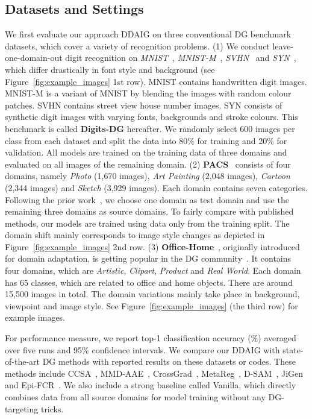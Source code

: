 \documentclass[letterpaper]{article}
\begin{document}
\subsection{Datasets and Settings}
We first evaluate our approach DDAIG on three conventional DG benchmark datasets, which cover a variety of recognition problems.
(1) We conduct leave-one-domain-out digit recognition on \emph{MNIST}~\cite{lecun1998mnist}, \emph{MNIST-M}~\cite{ganin2015unsupervised}, \emph{SVHN}~\cite{netzer2011svhn} and \emph{SYN}~\cite{ganin2015unsupervised}, which differ drastically in font style and background (see Figure~\ref{fig:example_images} 1st row). MNIST contains handwritten digit images. MNIST-M is a variant of MNIST by blending the images with random colour patches. SVHN contains street view house number images. SYN consists of synthetic digit images with varying fonts, backgrounds and stroke colours. This benchmark is called \textbf{Digits-DG} hereafter. We randomly select 600 images per class from each dataset and split the data into 80\% for training and 20\% for validation. All models are trained on the training data of three domains and evaluated on all images of the remaining domain.
(2) \textbf{PACS}~\cite{li2017deeper} consists of four domains, namely \emph{Photo} (1,670 images), \emph{Art Painting} (2,048 images), \emph{Cartoon} (2,344 images) and \emph{Sketch} (3,929 images). Each domain contains seven categories. Following the prior work~\cite{li2017deeper,cvpr19JiGen,li2019episodic}, we choose one domain as test domain and use the remaining three domains as source domains. To fairly compare with published methods, our models are trained using data only from the training split. The domain shift mainly corresponds to image style changes as depicted in Figure~\ref{fig:example_images} 2nd row.
(3) \textbf{Office-Home}~\cite{office_home}, originally introduced for domain adaptation, is getting popular in the DG community~\cite{d2018domain,cvpr19JiGen}. It contains four domains, which are \emph{Artistic}, \emph{Clipart}, \emph{Product} and \emph{Real World}. Each domain has 65 classes, which are related to office and home objects. There are around 15,500 images in total. The domain variations mainly take place in background, viewpoint and image style. See Figure~\ref{fig:example_images} (the third row) for example images.

For performance measure, we report top-1 classification accuracy (\%) averaged over five runs and 95\% confidence intervals. We compare our DDAIG with state-of-the-art DG methods with reported results on these datasets or codes. These methods include CCSA~\cite{motiian2017unified}, MMD-AAE~\cite{li2018mmdaae}, CrossGrad~\cite{shankar2018generalizing}, MetaReg~\cite{balaji2018metareg}, D-SAM~\cite{d2018domain}, JiGen~\cite{cvpr19JiGen} and Epi-FCR~\cite{li2019episodic}. We also include a strong baseline called Vanilla, which directly combines data from all source domains for model training without any DG-targeting tricks.
\end{document}

